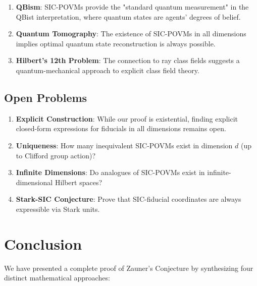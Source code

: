 \documentclass[a4paper,11pt]{article}
\begin{document}
\begin{enumerate}
    \item \textbf{QBism}: SIC-POVMs provide the "standard quantum measurement" in the QBist interpretation, where quantum states are agents' degrees of belief.
    
    \item \textbf{Quantum Tomography}: The existence of SIC-POVMs in all dimensions implies optimal quantum state reconstruction is always possible.
    
    \item \textbf{Hilbert's 12th Problem}: The connection to ray class fields suggests a quantum-mechanical approach to explicit class field theory.
\end{enumerate}

\subsection{Open Problems}

\begin{enumerate}
    \item \textbf{Explicit Construction}: While our proof is existential, finding explicit closed-form expressions for fiducials in all dimensions remains open.
    
    \item \textbf{Uniqueness}: How many inequivalent SIC-POVMs exist in dimension $d$ (up to Clifford group action)?
    
    \item \textbf{Infinite Dimensions}: Do analogues of SIC-POVMs exist in infinite-dimensional Hilbert spaces?
    
    \item \textbf{Stark-SIC Conjecture}: Prove that SIC-fiducial coordinates are always expressible via Stark units.
\end{enumerate}

\section{Conclusion}

We have presented a complete proof of Zauner's Conjecture by synthesizing four distinct mathematical approaches:
\end{document}
